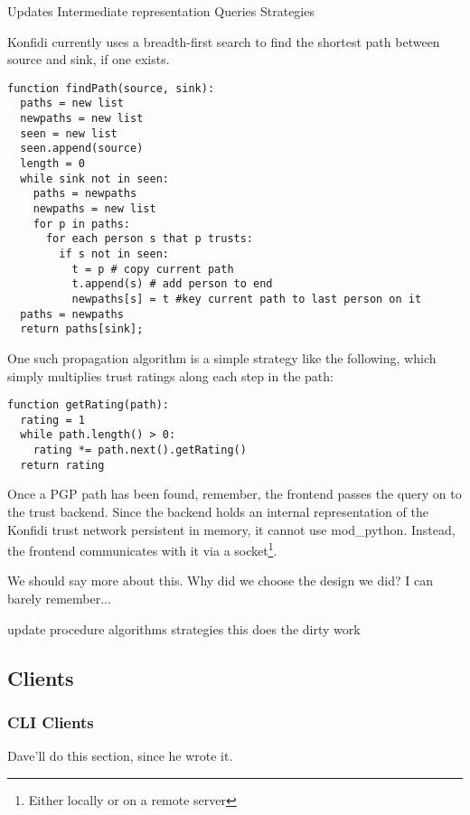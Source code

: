 \documentclass[onecolumn]{acm_proc_article-sp}
\begin{document}
Updates
Intermediate representation
Queries
Strategies

Konfidi currently uses a breadth-first search to find the shortest path between source and sink, if one exists.
\begin{verbatim}
function findPath(source, sink):
  paths = new list
  newpaths = new list
  seen = new list
  seen.append(source)
  length = 0
  while sink not in seen:
    paths = newpaths
    newpaths = new list
    for p in paths:
      for each person s that p trusts:
        if s not in seen:
          t = p # copy current path
          t.append(s) # add person to end
          newpaths[s] = t #key current path to last person on it
  paths = newpaths
  return paths[sink];
\end{verbatim}

One such propagation algorithm is a simple strategy like the following, which simply multiplies trust ratings along each step in the path:
\begin{verbatim}
function getRating(path):
  rating = 1
  while path.length() > 0:
    rating *= path.next().getRating()
  return rating
\end{verbatim}

Once a PGP path has been found, remember, the frontend passes the query on to the trust backend.  Since the backend holds an internal representation of the Konfidi trust network persistent in memory, it cannot use mod\_python.  Instead, the frontend communicates with it via a socket\footnote{Either locally or on a remote server}.

We should say more about this.  Why did we choose the design we did?  I can barely remember...

update procedure
algorithms
strategies
this does the dirty work

\subsection{Clients}
\subsubsection{CLI Clients}
Dave'll do this section, since he wrote it.
\end{document}
